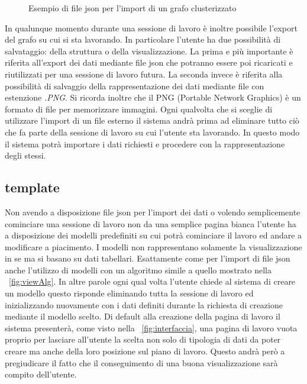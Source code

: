 {\begin{figure}[!htb]
\begin{center}
	\end{center}
	\caption{Esempio di file json per l'import di un grafo clusterizzato \label{fig:json}}
\end{figure}
In qualunque momento durante una sessione di lavoro è inoltre possibile l'export del grafo su cui si sta lavorando. In particolare l'utente ha due possibilità di salvataggio: della struttura o della visualizzazione. La prima e più importante è riferita all'export dei dati mediante file json che potranno essere poi ricaricati e riutilizzati per una sessione di lavoro futura. La seconda invece è riferita alla possibilità di salvaggio della rappresentazione dei dati mediante file con estenzione \textit{.PNG}. Si ricorda inoltre che il PNG (Portable Network Graphics) è un formato di file per memorizzare immagini. 
Ogni qualvolta che si sceglie di utilizzare l'import di un file esterno il sistema andrà prima ad eliminare tutto ciò che fa parte della sessione di lavoro su cui l'utente sta lavorando. In questo modo il sistema potrà importare i dati richiesti e procedere con la rappresentazione degli stessi.
\subsection{template}
Non avendo a disposizione file json per l'import dei dati o volendo semplicemente cominciare una sessione di lavoro non da una semplice pagina bianca l'utente ha a disposizione dei modelli predefiniti su cui potrà cominciare il lavoro ed andare a modificare a piacimento. I modelli non rappresentano solamente la visualizzazione in se ma si basano su dati tabellari. Esattamente come per l'import di file json anche l'utilizzo di modelli con un algoritmo simile a quello mostrato nella \figurename~\ref{fig:viewAlg}. In altre parole ogni qual volta l'utente chiede al sistema di creare un modello questo risponde eliminando tutta la sessione di lavoro ed inizializzando nuovamente con i dati definiti durante la richiesta di creazione mediante il modello scelto. Di default alla creazione della pagina di lavoro il sistema presenterà, come visto nella \figurename~\ref{fig:interfaccia}, una pagina di lavoro vuota proprio per lasciare all'utente la scelta non solo di tipologia di dati da poter creare ma anche della loro posizione sul piano di lavoro. Questo andrà però a pregiudicare il fatto che il conseguimento di una buona visualizzazione sarà compito dell'utente.
}
